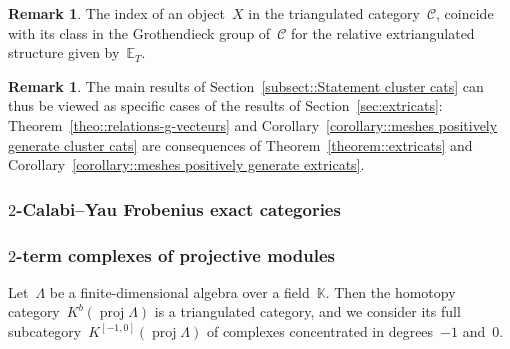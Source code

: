 \documentclass{amsart}
\theoremstyle{definition}
\newtheorem{remark}[theorem]{Remark}
\newcommand{\field}{\mathbb{K}}
\newcommand{\cat}{\mathcal{C}}
\newcommand{\proj}{\operatorname{proj}}
\begin{document}
\begin{remark}
The index of an object~$X$ in the triangulated category~$\cat$, coincide with its class in the Grothendieck group of~$\cat$ for the relative extriangulated structure given by~$\mathbb{E}_T$.
\end{remark}

\begin{remark}
 The main results of Section~\ref{subsect::Statement cluster cats} can thus be viewed as specific cases of the results of Section~\ref{sec:extricats}: Theorem~\ref{theo::relations-g-vecteurs} and Corollary~\ref{corollary::meshes positively generate cluster cats} are consequences of Theorem~\ref{theorem::extricats} and Corollary~\ref{corollary::meshes positively generate extricats}.
\end{remark}



\subsubsection{$2$-Calabi--Yau Frobenius exact categories}
\label{sect::2CYexact}

\subsubsection{$2$-term complexes of projective modules}
\label{sect::Kbproj}
Let~$\Lambda$ be a finite-dimensional algebra over a field~$\field$.  Then the homotopy category~$K^b(\proj \Lambda)$ is a triangulated category, and we consider its full subcategory~$K^{[-1,0]}(\proj \Lambda)$ of complexes concentrated in degrees~$-1$ and~$0$.
\end{document}
